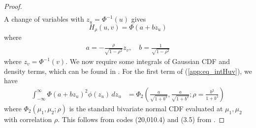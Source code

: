\documentclass[11pt,a4paper]{article}
\begin{document}
\begin{appendices}
\begin{proof}
\begin{align}
\end{align}
A change of variables with $z_u = \Phi^{-1}(u)$ gives 
\begin{equation*}
    H_\rho(u,v) = \Phi(a + bz_u)
\end{equation*}
where 
\begin{align*}
a = -\frac{\rho}{\sqrt{1-\rho^2}}z_v, \quad b = \frac{1}{\sqrt{1-\rho^2}}
\end{align*}
where $z_v = \Phi^{-1}(v)$. We now require some integrals of Gaussian CDF and density terms, which can be found in \cite{Owen1980}.
For the first term of (\ref{app:eq_intHuv}), we have
\begin{align*}
\int_{-\infty}^\infty \Phi(a + bz_u)^2\phi(z_u) \, dz_u &= \Phi_2\left(\frac{a}{\sqrt{1+b^2}},\frac{a}{\sqrt{1+b^2}}; \rho = \frac{b^2}{1+b^2}\right)
\end{align*}
where 
$\Phi_2(\mu_1, \mu_2; \rho)$ is the standard bivariate normal CDF evaluated at $\mu_1,\mu_2$ with correlation $\rho$. This follows from codes (20,010.4) and (3.5) from \citet{Owen1980}.


\end{proof}
\end{appendices}
\end{document}
